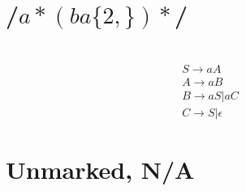 \documentclass{article} %
\begin{document}
    \section{/$a*(ba\{2,\})*$/}
    \section{}
            \begin{gather*}
                S \to aA\\
                A \to aB\\
                B \to aS | aC\\
                C \to S | \epsilon
            \end{gather*}
    \section{Unmarked, N/A}
\end{document}
